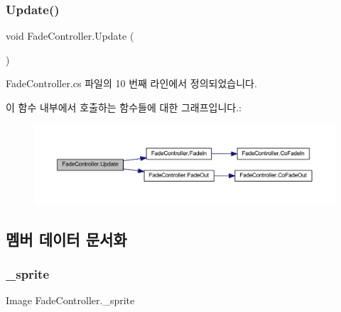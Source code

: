 \subsubsection{\texorpdfstring{Update()}{Update()}}
{\footnotesize\ttfamily void Fade\+Controller.\+Update (\begin{DoxyParamCaption}{ }\end{DoxyParamCaption})\hspace{0.3cm}{\ttfamily [private]}}



Fade\+Controller.\+cs 파일의 10 번째 라인에서 정의되었습니다.


\begin{DoxyCode}{0}

\end{DoxyCode}
이 함수 내부에서 호출하는 함수들에 대한 그래프입니다.\+:\nopagebreak
\begin{figure}[H]
\begin{center}
\leavevmode
\includegraphics[width=350pt]{d3/dd7/class_fade_controller_a0503954733cfa08c0442d9101c7c13a5_cgraph}
\end{center}
\end{figure}


\subsection{멤버 데이터 문서화}
\mbox{\label{class_fade_controller_a8efb7f7bb8771b66806f30f4db5bd6d5}} 
\subsubsection{\texorpdfstring{\_sprite}{\_sprite}}
{\footnotesize\ttfamily Image Fade\+Controller.\+\_\+sprite}




